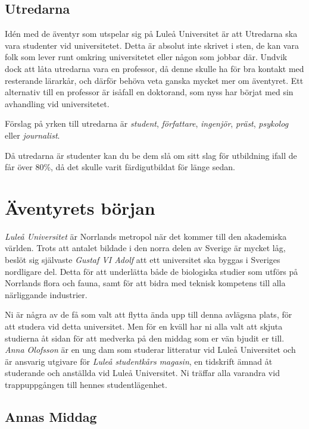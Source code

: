 \subsection{Utredarna}
%
Idén med de äventyr som utspelar sig på Luleå Universitet är att Utredarna ska vara studenter vid universitetet. Detta är absolut inte skrivet i sten, de kan vara folk som lever runt omkring universitetet eller någon som jobbar där. Undvik dock att låta utredarna vara en professor, då denne skulle ha för bra kontakt med resterande lärarkår, och därför behöva veta ganska mycket mer om äventyret. Ett alternativ till en professor är isåfall en doktorand, som nyss har börjat med sin avhandling vid universitetet. 

Förslag på yrken till utredarna är \textit{student}, \textit{författare}, \textit{ingenjör}, \textit{präst}, \textit{psykolog} eller \textit{journalist}.

Då utredarna är studenter kan du be dem slå om sitt slag för utbildning ifall de får över 80\%, då det skulle varit färdigutbildat för länge sedan.   

\section{Äventyrets början}

\begin{displayquote}
	\textit{Luleå Universitet} är Norrlands metropol när det kommer till den akademiska världen. Trots att antalet bildade i den norra delen av Sverige är mycket låg, beslöt sig självaste \textit{Gustaf VI Adolf} att ett universitet ska byggas i Sveriges nordligare del. Detta för att underlätta både de biologiska studier som utförs på Norrlands flora och fauna, samt för att bidra med teknisk kompetens till alla närliggande industrier.

	Ni är några av de få som valt att flytta ända upp till denna avlägsna plats, för att studera vid detta universitet. Men för en kväll har ni alla valt att skjuta studierna åt sidan för att medverka på den middag som er vän bjudit er till. \textit{Anna Olofsson} är en ung dam som studerar litteratur vid Luleå Universitet och är ansvarig utgivare för \textit{Luleå studentkårs magasin}, en tidskrift ämnad åt studerande och anställda vid Luleå Universitet. Ni träffar alla varandra vid trappuppgången till hennes studentlägenhet.
\end{displayquote}

\subsection{Annas Middag}

